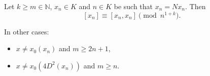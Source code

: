 Let $k \geq m \in \mathbb{N}$, $x_n \in K$ and $n \in K$ be such that $x_n = N x_n$. Then
$$[x_n] \equiv [x_n, x_n] \pmod{n^{1+k}}.$$

In other cases:
\begin{itemize}
\item[(i)] $x \neq x_0(x_n)$ and $m \geq 2n + 1$,
\item[(ii)] $x \neq x_0(4D^2(x_n))$ and $m \geq n$.
\end{itemize}
